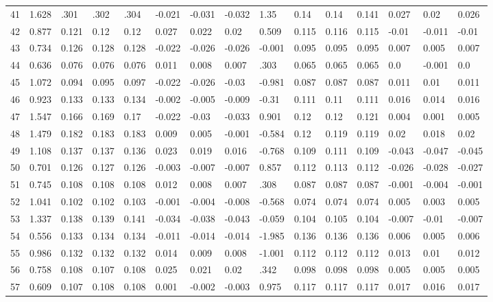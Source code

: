 \begin{table}
\begin{tabular}{|l|l|lll|lll|l|lll|lll}
		41 & 1.628 & .301 & .302 & .304 & -0.021 & -0.031 & -0.032 & 1.35 & 0.14 & 0.14 & 0.141 & 0.027 & 0.02 & 0.026 \\
		42 & 0.877 & 0.121 & 0.12 & 0.12 & 0.027 & 0.022 & 0.02 & 0.509 & 0.115 & 0.116 & 0.115 & -0.01 & -0.011 & -0.01 \\
		43 & 0.734 & 0.126 & 0.128 & 0.128 & -0.022 & -0.026 & -0.026 & -0.001 & 0.095 & 0.095 & 0.095 & 0.007 & 0.005 & 0.007 \\
		44 & 0.636 & 0.076 & 0.076 & 0.076 & 0.011 & 0.008 & 0.007 & .303 & 0.065 & 0.065 & 0.065 & 0.0 & -0.001 & 0.0 \\
		45 & 1.072 & 0.094 & 0.095 & 0.097 & -0.022 & -0.026 & -0.03 & -0.981 & 0.087 & 0.087 & 0.087 & 0.011 & 0.01 & 0.011 \\
		46 & 0.923 & 0.133 & 0.133 & 0.134 & -0.002 & -0.005 & -0.009 & -0.31 & 0.111 & 0.11 & 0.111 & 0.016 & 0.014 & 0.016 \\
		47 & 1.547 & 0.166 & 0.169 & 0.17 & -0.022 & -0.03 & -0.033 & 0.901 & 0.12 & 0.12 & 0.121 & 0.004 & 0.001 & 0.005 \\
		48 & 1.479 & 0.182 & 0.183 & 0.183 & 0.009 & 0.005 & -0.001 & -0.584 & 0.12 & 0.119 & 0.119 & 0.02 & 0.018 & 0.02 \\
		49 & 1.108 & 0.137 & 0.137 & 0.136 & 0.023 & 0.019 & 0.016 & -0.768 & 0.109 & 0.111 & 0.109 & -0.043 & -0.047 & -0.045 \\
		50 & 0.701 & 0.126 & 0.127 & 0.126 & -0.003 & -0.007 & -0.007 & 0.857 & 0.112 & 0.113 & 0.112 & -0.026 & -0.028 & -0.027 \\
		51 & 0.745 & 0.108 & 0.108 & 0.108 & 0.012 & 0.008 & 0.007 & .308 & 0.087 & 0.087 & 0.087 & -0.001 & -0.004 & -0.001 \\
		52 & 1.041 & 0.102 & 0.102 & 0.103 & -0.001 & -0.004 & -0.008 & -0.568 & 0.074 & 0.074 & 0.074 & 0.005 & 0.003 & 0.005 \\
		53 & 1.337 & 0.138 & 0.139 & 0.141 & -0.034 & -0.038 & -0.043 & -0.059 & 0.104 & 0.105 & 0.104 & -0.007 & -0.01 & -0.007 \\
		54 & 0.556 & 0.133 & 0.134 & 0.134 & -0.011 & -0.014 & -0.014 & -1.985 & 0.136 & 0.136 & 0.136 & 0.006 & 0.005 & 0.006 \\
		55 & 0.986 & 0.132 & 0.132 & 0.132 & 0.014 & 0.009 & 0.008 & -1.001 & 0.112 & 0.112 & 0.112 & 0.013 & 0.01 & 0.012 \\
		56 & 0.758 & 0.108 & 0.107 & 0.108 & 0.025 & 0.021 & 0.02 & .342 & 0.098 & 0.098 & 0.098 & 0.005 & 0.005 & 0.005 \\
		57 & 0.609 & 0.107 & 0.108 & 0.108 & 0.001 & -0.002 & -0.003 & 0.975 & 0.117 & 0.117 & 0.117 & 0.017 & 0.016 & 0.017 \\

\end{tabular}
\end{table}

